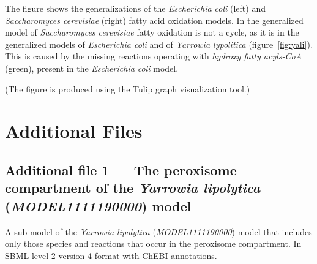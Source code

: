 \documentclass[10pt]{bmc_article}
\newenvironment{bmcformat}{\baselineskip20pt\sloppy\setboolean{publ}{false}}{\baselineskip20pt\sloppy}
\begin{document}
\begin{bmcformat}
      The figure shows the generalizations of the \textit{Escherichia coli} (left) and \textit{Saccharomyces cerevisiae} (right) fatty acid oxidation models. In the generalized model of \textit{Saccharomyces cerevisiae} fatty oxidation is not a cycle, as it is in the generalized models of \textit{Escherichia coli} and of \textit{Yarrowia lypolitica} (figure~\ref{fig:yali}).  This is caused by the missing reactions operating with \textit{hydroxy fatty acyls-CoA} (green), present in the \textit{Escherichia coli} model.
      
      (The figure is produced using the Tulip graph visualization tool.)
\label{fig:gen}







\section*{Additional Files}
  \subsection*{Additional file 1 --- The peroxisome compartment of the \textit{Yarrowia lipolytica} (\emph{MODEL1111190000}) model}
    A sub-model of the \textit{Yarrowia lipolytica} (\emph{MODEL1111190000}) model that includes only those species and reactions that occur in the peroxisome compartment. In  SBML level 2 version 4\cite{Hucka08} format with ChEBI annotations.

\end{bmcformat}
\end{document}
